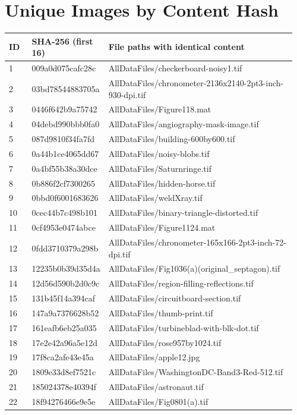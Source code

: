 \documentclass[11pt]{article}
\begin{document}
\section*{Unique Images by Content Hash}
\begin{longtable}{p{0.08\linewidth}p{0.22\linewidth}p{0.66\linewidth}}
\toprule ID & SHA-256 (first 16) & File paths with identical content \\
\midrule
1 & 009a0d075cafc28c & AllDataFiles/checkerboard-noisy1.tif \\
2 & 03bd78544883705a & AllDataFiles/chronometer-2136x2140-2pt3-inch-930-dpi.tif \\
3 & 0446f642b9a75742 & AllDataFiles/Figure118.mat \\
4 & 04debd990bbb0fa0 & AllDataFiles/angiography-mask-image.tif \\
5 & 087d9810f34fa7fd & AllDataFiles/building-600by600.tif \\
6 & 0a44b1ce4065dd67 & AllDataFiles/noisy-blobs.tif \\
7 & 0a4bf55b38a30dce & AllDataFiles/Saturnringe.tif \\
8 & 0b886f2cf7300265 & AllDataFiles/hidden-horse.tif \\
9 & 0bbd0f6001683626 & AllDataFiles/weldXray.tif \\
10 & 0cec44b7c498b101 & AllDataFiles/binary-triangle-distorted.tif \\
11 & 0cf4953e0474abce & AllDataFiles/Figure1124.mat \\
12 & 0fdd3710379a298b & AllDataFiles/chronometer-165x166-2pt3-inch-72-dpi.tif \\
13 & 12235b0b39d35d4a & AllDataFiles/Fig1036(a)(original\_septagon).tif \\
14 & 12d56d590b2d0c9c & AllDataFiles/region-filling-reflections.tif \\
15 & 131b45f14a394caf & AllDataFiles/circuitboard-section.tif \\
16 & 147a9a7376628b52 & AllDataFiles/thumb-print.tif \\
17 & 161eafb6eb25a035 & AllDataFiles/turbineblad-with-blk-dot.tif \\
18 & 17e2e42a96a5e12d & AllDataFiles/rose957by1024.tif \\
19 & 17f8ca2afe43e45a & AllDataFiles/apple12.jpg \\
20 & 1809e33d8ef7521c & AllDataFiles/WashingtonDC-Band3-Red-512.tif \\
21 & 185024378e40394f & AllDataFiles/astronaut.tif \\
22 & 18f94276466e9e5e & AllDataFiles/Fig0801(a).tif \\

\end{longtable}
\end{document}
